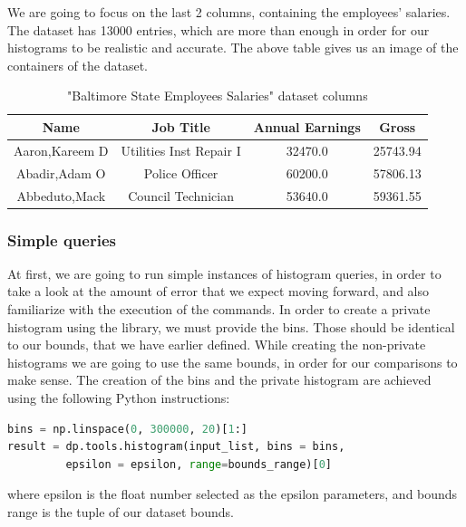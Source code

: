 We are going to focus on the last 2 columns, containing the employees' salaries. The dataset has 13000 entries, which are more than enough in order for our histograms to be realistic and accurate. The above table gives us an image of the containers of the dataset.

\begin{table}[!htb]
    \centering

    \caption{"Baltimore State Employees Salaries" dataset columns}
    \label{numbers}

    \begin{tabular}{| c | c | c | c |}
      \hline 
      Name & Job Title & Annual Earnings & Gross \\
      \hline
      Aaron,Kareem D & Utilities Inst Repair I	 & 32470.0 & 25743.94 \\
      \hline
      Abadir,Adam O	 & Police Officer &  60200.0 & 57806.13  \\
      \hline
      Abbeduto,Mack & Council Technician & 53640.0 &  59361.55 \\
      \hline
    \end{tabular}
\end{table}

\subsubsection{Simple queries}

At first, we are going to run simple instances of histogram queries, in order to take a look at the amount of error that we expect moving forward, and also familiarize with the execution of the commands. In order to create a private histogram using the library, we must provide the bins. Those should be identical to our bounds, that we have earlier defined. While creating the non-private histograms we are going to use the same bounds, in order for our comparisons to make sense. The creation of the bins and the private histogram are achieved using the following Python instructions:

\bigskip
\begin{lstlisting}[basicstyle= \footnotesize,
language=Python]
bins = np.linspace(0, 300000, 20)[1:]
result = dp.tools.histogram(input_list, bins = bins, 
         epsilon = epsilon, range=bounds_range)[0]
\end{lstlisting}
\bigskip

where epsilon is the float number selected as the epsilon parameters, and bounds range is the tuple of our dataset bounds.

